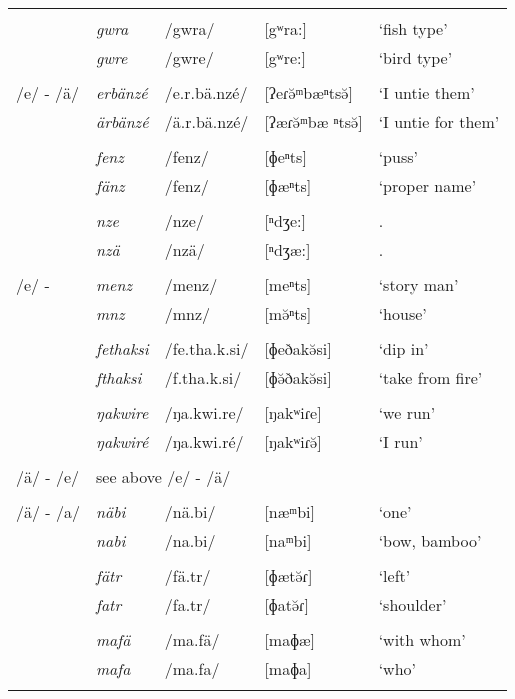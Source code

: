 \begin{longtable} {lllll}
		&&&&\\
		& \emph{gwra} & /gwra/ & [{\ᵑ}gʷra:] & `fish type'\\
		& \emph{gwre} & /gwre/ & [{\ᵑ}gʷre:] & `bird type'\\
		&&&&\\
		/e/ - /ä/ & \emph{erbänzé} & /e.r.bä.nzé/ & [ʔeɾə̆ᵐbæⁿtsə̆] & `I untie them'\\
		& \emph{ärbänzé} & /ä.r.bä.nzé/ & [ʔæɾə̆ᵐbæ ⁿtsə̆] & `I untie for them'\\
		&&&&\\
		& \emph{fenz} & /fenz/ & [ɸeⁿts] & `puss'\\
		& \emph{fänz} & /fenz/ & [ɸæⁿts] & `proper name'\\
		&&&&\\
		& \emph{nze} & /nze/ & [ⁿdʒe:] & \Fsg.\Erg\\
		& \emph{nzä} & /nzä/ & [ⁿdʒæ:] & \Fsg.\Abs\\
		&&&&\\
		/e/ - \Zero{} & \emph{menz} & /menz/ & [meⁿts] & `story man'\\
		& \emph{mnz} & /mnz/ & [mə̆ⁿts] & `house'\\
		&&&&\\
		& \emph{fethaksi} & /fe.tha.k.si/ & [ɸeðakə̆si] & `dip in'\\
		& \emph{fthaksi} & /f.tha.k.si/ & [ɸə̆ðakə̆si] & `take from fire'\\
		&&&&\\
		& \emph{ŋakwire} & /ŋa.kwi.re/ & [ŋakʷiɾe] & `we run'\\
		& \emph{ŋakwiré} & /ŋa.kwi.ré/ & [ŋakʷiɾə̆] & `I run'\\
		&&&&\\
		/ä/ - /e/ & \multicolumn{4}{l}{see above /e/ - /ä/}\\
		&&&&\\
		/ä/ - /a/ & \emph{näbi} & /nä.bi/ & [næᵐbi] & `one'\\
		& \emph{nabi} & /na.bi/ & [naᵐbi] & `bow, bamboo'\\
		&&&&\\
		& \emph{fätr} & /fä.tr/ & [ɸætə̆ɾ] & `left'\\
		& \emph{fatr} & /fa.tr/ & [ɸatə̆ɾ] & `shoulder'\\
		&&&&\\
		& \emph{mafä} & /ma.fä/ & [maɸæ] & `with whom'\\
		& \emph{mafa} & /ma.fa/ & [maɸa] & `who'\\
		&&&&\\

\end{longtable}
